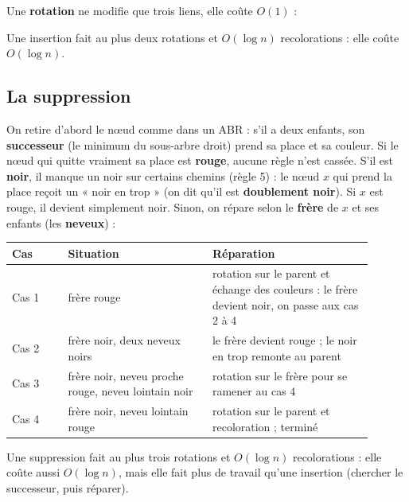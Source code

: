 \documentclass[12pt,a4paper]{report}
\begin{document}
Une \textbf{rotation} ne modifie que trois liens, elle coûte $O(1)$ :
\begin{center}
\end{center}
Une insertion fait au plus deux rotations et $O(\log n)$ recolorations : elle coûte $O(\log n)$.

\subsection{La suppression}
On retire d'abord le nœud comme dans un ABR : s'il a deux enfants, son \textbf{successeur} (le minimum du sous-arbre droit) prend sa place et sa couleur. Si le nœud qui quitte vraiment sa place est \textbf{rouge}, aucune règle n'est cassée. S'il est \textbf{noir}, il manque un noir sur certains chemins (règle 5) : le nœud $x$ qui prend la place reçoit un « noir en trop » (on dit qu'il est \textbf{doublement noir}). Si $x$ est rouge, il devient simplement noir. Sinon, on répare selon le \textbf{frère} de $x$ et ses enfants (les \textbf{neveux}) :

\begin{center}
\small
\begin{tabular}{p{0.14\linewidth}p{0.36\linewidth}p{0.40\linewidth}}
  \toprule
  Cas & Situation & Réparation \\
  \midrule
  Cas 1 & frère rouge & rotation sur le parent et échange des couleurs : le frère devient noir, on passe aux cas 2 à 4 \\
  Cas 2 & frère noir, deux neveux noirs & le frère devient rouge ; le noir en trop remonte au parent \\
  Cas 3 & frère noir, neveu proche rouge, neveu lointain noir & rotation sur le frère pour se ramener au cas 4 \\
  Cas 4 & frère noir, neveu lointain rouge & rotation sur le parent et recoloration ; terminé \\
  \bottomrule
\end{tabular}
\end{center}
Une suppression fait au plus trois rotations et $O(\log n)$ recolorations : elle coûte aussi $O(\log n)$, mais elle fait plus de travail qu'une insertion (chercher le successeur, puis réparer).
\end{document}

